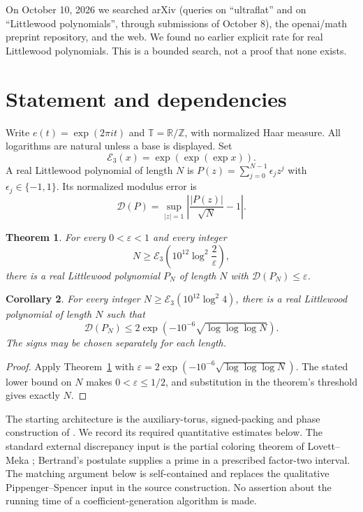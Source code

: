 \documentclass[11pt]{article}
\newtheorem{theorem}{Theorem}[section]
\newtheorem{corollary}[theorem]{Corollary}
\theoremstyle{remark}
\newcommand{\R}{\mathbb R}
\newcommand{\Z}{\mathbb Z}
\newcommand{\T}{\mathbb T}
\newcommand{\Ethree}{\mathcal E_3}
\begin{document}
On October 10, 2026 we searched arXiv (queries on ``ultraflat'' and on
``Littlewood polynomials'', through submissions of October 8), the openai/math
preprint repository, and the web. We found no earlier explicit rate for real
Littlewood polynomials. This is a bounded search, not a proof that none
exists.

\section{Statement and dependencies}

Write $e(t)=\exp(2\pi i t)$ and $\T=\R/\Z$, with normalized Haar measure.
All logarithms are natural unless a base is displayed. Set
\[
 \Ethree(x)=\exp(\exp(\exp x)).
\]
A real Littlewood polynomial of length $N$ is
$P(z)=\sum_{j=0}^{N-1}\epsilon_jz^j$ with $\epsilon_j\in\{-1,1\}$.
Its normalized modulus error is
\[
 \mathcal D(P)=\sup_{|z|=1}
 \left|\frac{|P(z)|}{\sqrt N}-1\right|.
\]

\begin{theorem}\label{thm:main}
For every $0<\varepsilon<1$ and every integer
\[
 N\ge \Ethree\!\left(10^{12}\log^2\frac2\varepsilon\right),
\]
there is a real Littlewood polynomial $P_N$ of length $N$ with
$\mathcal D(P_N)\le\varepsilon$.
\end{theorem}

\begin{corollary}\label{cor:rate}
For every integer $N\ge\Ethree(10^{12}\log^2 4)$, there is a real
Littlewood polynomial of length $N$ such that
\[
 \mathcal D(P_N)\le
 2\exp\!\left(-10^{-6}\sqrt{\log\log\log N}\right).
\]
The signs may be chosen separately for each length.
\end{corollary}

\begin{proof}
Apply Theorem~\ref{thm:main} with
$\varepsilon=2\exp(-10^{-6}\sqrt{\log\log\log N})$.
The stated lower bound on $N$ makes $0<\varepsilon\le1/2$, and substitution
in the theorem's threshold gives exactly $N$.
\end{proof}

The starting architecture is the auxiliary-torus, signed-packing and phase
construction of \cite{main,predecessor}. We record its required quantitative
estimates below. The standard external discrepancy input is the partial
coloring theorem of Lovett--Meka \cite[Theorem 4]{lovettmeka}; Bertrand's
postulate supplies a prime in a prescribed factor-two interval. The matching
argument below is self-contained and replaces the qualitative
Pippenger--Spencer input in the source construction. No assertion about the
running time of a coefficient-generation algorithm is made.
\end{document}
